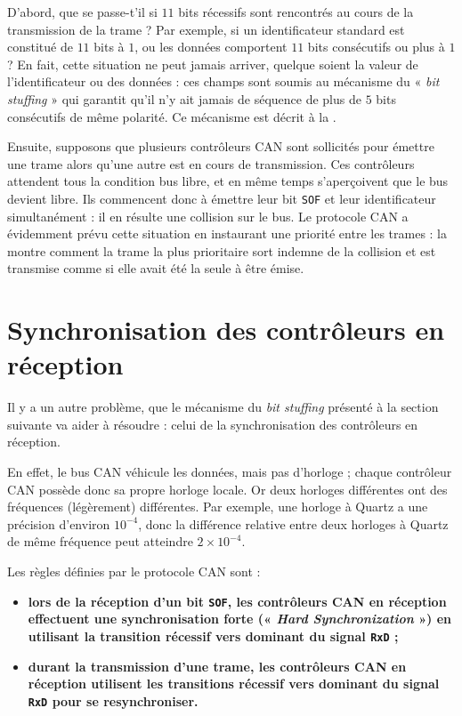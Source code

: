D'abord, que se passe-t'il si $11$ bits récessifs sont rencontrés au cours de la transmission de la trame ? Par exemple, si un identificateur standard est constitué de $11$ bits à $1$, ou les données comportent $11$ bits consécutifs ou plus à $1$ ? En fait, cette situation ne peut jamais arriver, quelque soient la valeur de l'identificateur ou des données : ces champs sont soumis au mécanisme du « \emph{bit stuffing} » qui garantit qu'il n'y ait jamais de séquence de plus de $5$ bits consécutifs de même polarité. Ce mécanisme est décrit à la .

Ensuite, supposons que plusieurs contrôleurs CAN sont sollicités pour émettre une trame alors qu'une autre est en cours de transmission. Ces contrôleurs attendent tous la condition bus libre, et en même temps s'aperçoivent que le bus devient libre. Ils commencent donc à émettre leur bit \texttt{SOF} et leur identificateur simultanément : il en résulte une collision sur le bus. Le protocole CAN a évidemment prévu cette situation en instaurant une priorité entre les trames : la  montre comment la trame la plus prioritaire sort indemne de la collision et est transmise comme si elle avait été la seule à être émise. 








\section{Synchronisation des contrôleurs en réception}

Il y a un autre problème, que le mécanisme du \emph{bit stuffing} présenté à la section suivante va aider à résoudre : celui de la synchronisation des contrôleurs en réception.

En effet, le bus CAN véhicule les données, mais pas d'horloge ; chaque contrôleur CAN possède donc sa propre horloge locale. Or deux horloges différentes ont des fréquences (légèrement) différentes. Par exemple, une horloge à Quartz a une précision d'environ $10^{-4}$, donc la différence relative entre deux horloges à Quartz de même fréquence peut atteindre $2\times10^{-4}$.

Les règles définies par le protocole CAN sont :
\begin{itemize}
\item {\bf lors de la réception d'un bit \texttt{SOF}, les contrôleurs CAN en réception effectuent une synchronisation forte (« \emph{Hard Synchronization} ») en utilisant la transition récessif vers dominant du signal \texttt{RxD} ;} 
\item {\bf durant la transmission d'une trame, les contrôleurs CAN en réception utilisent les transitions récessif vers dominant du signal \texttt{RxD} pour se resynchroniser.} 
\end{itemize}

